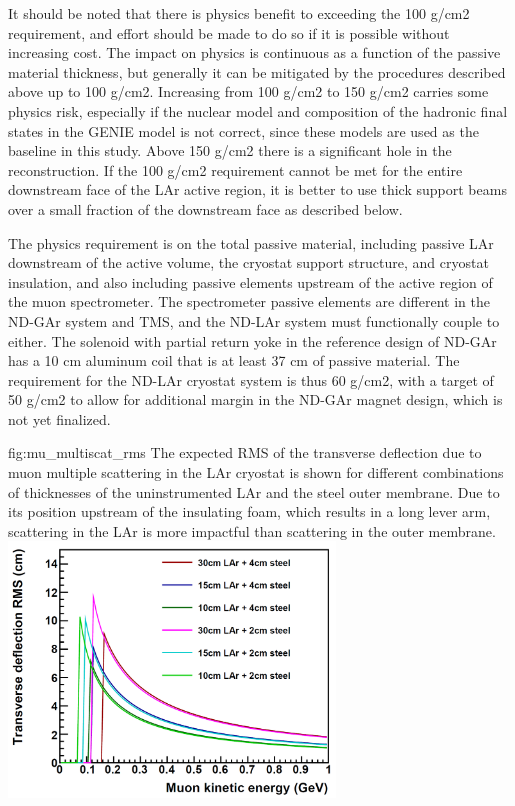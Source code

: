 It should be noted that there is physics benefit to exceeding the 100 g/cm2 requirement, and effort should be made to do so if it is possible without increasing cost. The impact on physics is continuous as a function of the passive material thickness, but generally it can be mitigated by the procedures described above up to 100 g/cm2. Increasing from 100 g/cm2 to 150 g/cm2 carries some physics risk, especially if the nuclear model and composition of the hadronic final states in the GENIE model is not correct, since these models are used as the baseline in this study. Above 150 g/cm2 there is a significant hole in the reconstruction. If the 100 g/cm2 requirement cannot be met for the entire downstream face of the LAr active region, it is better to use thick support beams over a small fraction of the downstream face as described below.

The physics requirement is on the total passive material, including passive LAr downstream of the active volume, the cryostat support structure, and cryostat insulation, and also including passive elements upstream of the active region of the muon spectrometer. The spectrometer passive elements are different in the ND-GAr system and TMS, and the ND-LAr system must functionally couple to either. The solenoid with partial return yoke in the reference design of ND-GAr has a 10 cm aluminum coil that is at least 37 cm of passive material. The requirement for the ND-LAr cryostat system is thus 60 g/cm2, with a target of 50 g/cm2 to allow for additional margin in the ND-GAr magnet design, which is not yet finalized.

\begin{dunefigure}{fig:mu_multiscat_rms}
{The expected RMS of the transverse deflection due to muon multiple scattering in the LAr cryostat is shown for different combinations of thicknesses of the uninstrumented LAr and the steel outer membrane. Due to its position upstream of the insulating foam, which results in a long lever arm, scattering in the LAr is more impactful than scattering in the outer membrane.}
\includegraphics[width=0.65\textwidth]{graphics/cryostat/mu_multiscat_rms.png}
\end{dunefigure}

